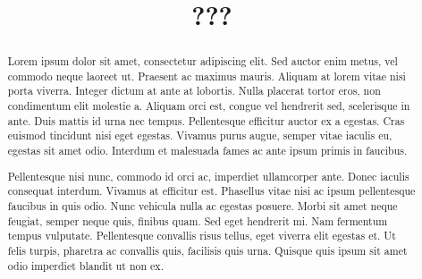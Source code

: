 \documentclass[aos]{imsart}
\theoremstyle{plain}
\begin{document}
\begin{frontmatter}
\title{???}


\begin{abstract}
Lorem ipsum dolor sit amet, consectetur adipiscing elit. Sed auctor enim metus, vel commodo neque laoreet ut. Praesent ac maximus mauris. Aliquam at lorem vitae nisi porta viverra. Integer dictum at ante at lobortis. Nulla placerat tortor eros, non condimentum elit molestie a. Aliquam orci est, congue vel hendrerit sed, scelerisque in ante. Duis mattis id urna nec tempus. Pellentesque efficitur auctor ex a egestas. Cras euismod tincidunt nisi eget egestas. Vivamus purus augue, semper vitae iaculis eu, egestas sit amet odio. Interdum et malesuada fames ac ante ipsum primis in faucibus.

Pellentesque nisi nunc, commodo id orci ac, imperdiet ullamcorper ante. Donec iaculis consequat interdum. Vivamus at efficitur est. Phasellus vitae nisi ac ipsum pellentesque faucibus in quis odio. Nunc vehicula nulla ac egestas posuere. Morbi sit amet neque feugiat, semper neque quis, finibus quam. Sed eget hendrerit mi. Nam fermentum tempus vulputate. Pellentesque convallis risus tellus, eget viverra elit egestas et. Ut felis turpis, pharetra ac convallis quis, facilisis quis urna. Quisque quis ipsum sit amet odio imperdiet blandit ut non ex.


\end{abstract}
\end{frontmatter}
\end{document}
